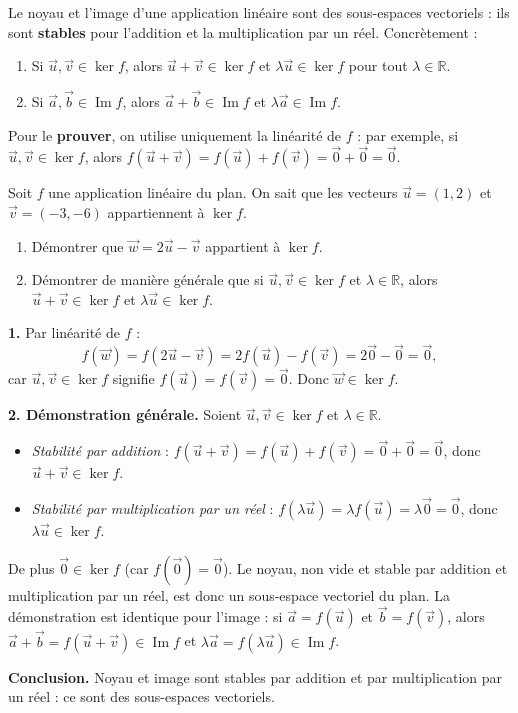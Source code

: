 \documentclass[11pt]{article}
\newcommand{\cle}[1]{{\popxbold\color{popdark}#1}}
\begin{document}
\begin{methode}
Le noyau et l'image d'une application linéaire sont des \cle{sous-espaces vectoriels} : ils sont \textbf{stables} pour l'addition et la multiplication par un réel. Concrètement :
\begin{enumerate}
\item Si $\vec{u}, \vec{v} \in \ker f$, alors $\vec{u} + \vec{v} \in \ker f$ et $\lambda \vec{u} \in \ker f$ pour tout $\lambda \in \mathbb{R}$.
\item Si $\vec{a}, \vec{b} \in \operatorname{Im} f$, alors $\vec{a} + \vec{b} \in \operatorname{Im} f$ et $\lambda \vec{a} \in \operatorname{Im} f$.
\end{enumerate}
Pour le \textbf{prouver}, on utilise uniquement la linéarité de $f$ : par exemple, si $\vec{u}, \vec{v} \in \ker f$, alors $f(\vec{u} + \vec{v}) = f(\vec{u}) + f(\vec{v}) = \vec{0} + \vec{0} = \vec{0}$.
\end{methode}

\begin{exoresolu}
Soit $f$ une application linéaire du plan. On sait que les vecteurs $\vec{u} = (1, 2)$ et $\vec{v} = (-3, -6)$ appartiennent à $\ker f$.
\begin{enumerate}
\item Démontrer que $\vec{w} = 2\vec{u} - \vec{v}$ appartient à $\ker f$.
\item Démontrer de manière générale que si $\vec{u}, \vec{v} \in \ker f$ et $\lambda \in \mathbb{R}$, alors $\vec{u} + \vec{v} \in \ker f$ et $\lambda \vec{u} \in \ker f$.
\end{enumerate}
\tcblower
\textbf{1.} Par linéarité de $f$ :
\[ f(\vec{w}) = f(2\vec{u} - \vec{v}) = 2 f(\vec{u}) - f(\vec{v}) = 2\vec{0} - \vec{0} = \vec{0}, \]
car $\vec{u}, \vec{v} \in \ker f$ signifie $f(\vec{u}) = f(\vec{v}) = \vec{0}$. Donc $\vec{w} \in \ker f$.

\textbf{2. Démonstration générale.} Soient $\vec{u}, \vec{v} \in \ker f$ et $\lambda \in \mathbb{R}$.
\begin{itemize}
\item \emph{Stabilité par addition} : $f(\vec{u} + \vec{v}) = f(\vec{u}) + f(\vec{v}) = \vec{0} + \vec{0} = \vec{0}$, donc $\vec{u} + \vec{v} \in \ker f$.
\item \emph{Stabilité par multiplication par un réel} : $f(\lambda \vec{u}) = \lambda f(\vec{u}) = \lambda \vec{0} = \vec{0}$, donc $\lambda \vec{u} \in \ker f$.
\end{itemize}
De plus $\vec{0} \in \ker f$ (car $f(\vec{0}) = \vec{0}$). Le noyau, non vide et stable par addition et multiplication par un réel, est donc un sous-espace vectoriel du plan. La démonstration est identique pour l'image : si $\vec{a} = f(\vec{u})$ et $\vec{b} = f(\vec{v})$, alors $\vec{a} + \vec{b} = f(\vec{u} + \vec{v}) \in \operatorname{Im} f$ et $\lambda \vec{a} = f(\lambda \vec{u}) \in \operatorname{Im} f$.

\textbf{Conclusion.} Noyau et image sont stables par addition et par multiplication par un réel : ce sont des sous-espaces vectoriels.
\end{exoresolu}
\end{document}
